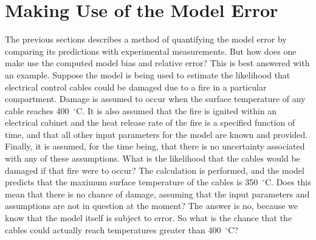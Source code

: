 \section{Making Use of the Model Error}

The previous sections describes a method of quantifying the model error by comparing its predictions with experimental measurements. But how does one make use the computed
model bias and relative error? This is best answered with an example. Suppose the model is being used to estimate the likelihood that
electrical control cables could be damaged due to
a fire in a particular compartment. Damage is assumed to occur when the surface temperature of any cable reaches 400~$^\circ$C. It is also assumed that the fire is
ignited within an electrical cabinet and the heat release rate of the fire is a specified function of time, and that all other input
parameters for the model are known and provided. Finally, it is assumed, for the time being, that there is no uncertainty
associated with any of these assumptions. What is the likelihood that the cables would be damaged if that fire were to occur? The calculation is performed, and the
model predicts that the maximum surface temperature of the cables is 350~$^\circ$C. Does this mean that there is no chance of damage, assuming that the input parameters
and assumptions are not in question at the moment? The answer is no, because we know that the model itself is subject to error. So what is the chance that the
cables could actually reach temperatures greater than 400~$^\circ$C?

